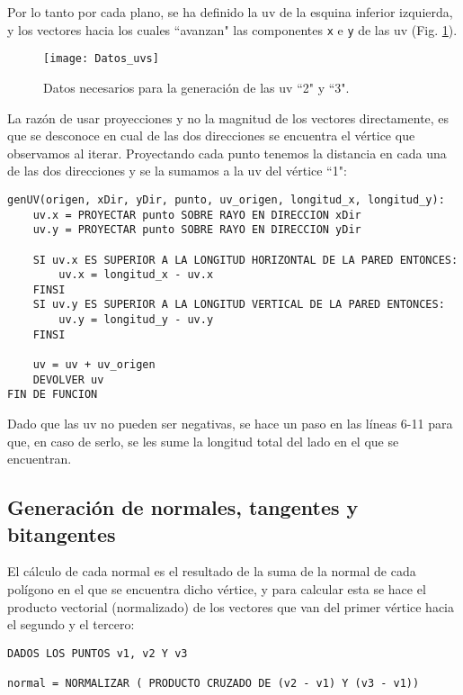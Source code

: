 Por lo tanto por cada plano, se ha definido la uv de la esquina inferior izquierda, y los vectores hacia los cuales ``avanzan" las componentes \texttt{x} e \texttt{y} de las uv (Fig. \ref{fig:datos_uvs}).

\begin{figure}[H]
    \centering
    \texttt{[image: Datos\_uvs]}
    \caption{Datos necesarios para la generación de las uv ``2" y ``3".}
    \label{fig:datos_uvs}
\end{figure}

La razón de usar proyecciones y no la magnitud de los vectores directamente, es que se desconoce en cual de las dos direcciones se encuentra el vértice que observamos al iterar. Proyectando cada punto tenemos la distancia en cada una de las dos direcciones y se la sumamos a la uv del vértice ``1":

\begin{lstlisting}
genUV(origen, xDir, yDir, punto, uv_origen, longitud_x, longitud_y):
    uv.x = PROYECTAR punto SOBRE RAYO EN DIRECCION xDir
    uv.y = PROYECTAR punto SOBRE RAYO EN DIRECCION yDir
    
    SI uv.x ES SUPERIOR A LA LONGITUD HORIZONTAL DE LA PARED ENTONCES:
        uv.x = longitud_x - uv.x
    FINSI
    SI uv.y ES SUPERIOR A LA LONGITUD VERTICAL DE LA PARED ENTONCES:
        uv.y = longitud_y - uv.y
    FINSI
    
    uv = uv + uv_origen
    DEVOLVER uv
FIN DE FUNCION
\end{lstlisting}

Dado que las uv no pueden ser negativas, se hace un paso en las líneas 6-11 para que, en caso de serlo, se les sume la longitud total del lado en el que se encuentran.

\subsection{Generación de normales, tangentes y bitangentes}
El cálculo de cada normal es el resultado de la suma de la normal de cada polígono en el que se encuentra dicho vértice, y para calcular esta se hace el producto vectorial (normalizado) de los vectores que van del primer vértice hacia el segundo y el tercero:

\begin{lstlisting}
DADOS LOS PUNTOS v1, v2 Y v3

normal = NORMALIZAR ( PRODUCTO CRUZADO DE (v2 - v1) Y (v3 - v1))
\end{lstlisting}

